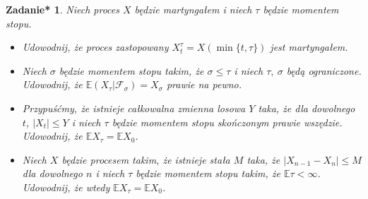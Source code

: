 \documentclass{mwart}
\newtheorem{zdt}[zd]{Zadanie*}
\begin{document}
\begin{zdt}
Niech proces $X$ będzie martyngałem i niech $\tau$ będzie momentem stopu.
\begin{itemize}
\item Udowodnij, że proces zastopowany $X^{\tau}_t = X(\min\{t, \tau\})$ jest martyngałem.
\item Niech $\sigma$ będzie momentem stopu takim, że $\sigma \leq \tau$ i niech $\tau,\ \sigma$ będą ograniczone. Udowodnij, że $\mathbb{E}\left(X_{\tau}|\mathcal{F}_{\sigma}\right) = X_{\sigma}$ prawie na pewno.
\item Przypuśćmy, że istnieje całkowalna zmienna losowa $Y$ taka, że dla dowolnego $t$, $|X_t| \leq Y$ i niech $\tau$ będzie momentem stopu skończonym prawie wszędzie. Udowodnij, że $\mathbb{E}X_{\tau} = \mathbb{E}X_0 $.
\item Niech $X$ będzie procesem takim, że istnieje stała $M$ taka, że $|X_{n-1} - X_n| \leq M$ dla dowolnego $n$ i niech $\tau$ będzie momentem stopu takim, że $\mathbb{E}\tau < \infty$. Udowodnij, że wtedy $\mathbb{E}X_{\tau} = \mathbb{E}X_0$.
\end{itemize}
\end{zdt}
\end{document}
